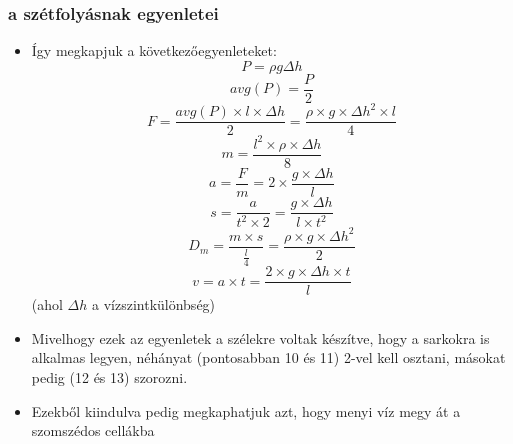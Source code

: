 \documentclass{beamer}
\begin{document}
	\begin{frame}[allowframebreaks]
		\frametitle{a szétfolyásnak egyenletei}
		\begin{itemize}
			\item Így megkapjuk a következőegyenleteket:
			\begin{equation}
				P = \rho g\Delta h
			\end{equation}
			\begin{equation}
				avg(P) = \frac{P}{2}
			\end{equation}
			\begin{equation}
				F = \frac{avg(P)\times l\times \Delta h }{2}= \frac{\rho \times g\times \Delta h^2\times l}{4}
			\end{equation}
			\begin{equation}
				m = \frac{l^2\times \rho \times \Delta h}{8}
			\end{equation}
			\begin{equation}
				a = \frac{F}{m} = 2\times \frac{g\times \Delta h}{l}
			\end{equation}
			\begin{equation}
				s = \frac{a}{t^2\times 2} = \frac{g\times \Delta h}{l\times t^2}
			\end{equation}
			\begin{equation}
				D_m = \frac{m\times s}{\frac{l}{4}} = \frac{\rho \times g\times \Delta h^2}{2}
			\end{equation}
			\begin{equation}
				v = a\times t = \frac{2\times g\times \Delta h\times t}{l}
			\end{equation}
				(ahol $\Delta h$ a vízszintkülönbség)
			\item Mivelhogy ezek az egyenletek a szélekre voltak készítve, hogy a sarkokra is alkalmas legyen, néhányat (pontosabban 10 és 11) 2-vel kell osztani, másokat pedig (12 és 13) szorozni.
			\item Ezekből kiindulva pedig megkaphatjuk azt, hogy menyi víz megy át a szomszédos cellákba 
		\end{itemize}
	\end{frame}
\end{document}
